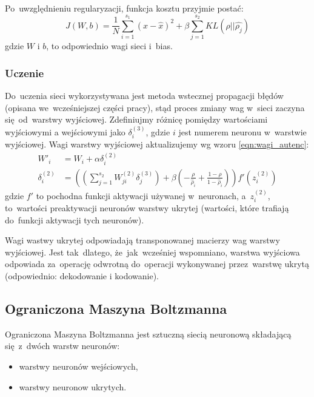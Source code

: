 Po~uwzględnieniu regularyzacji, funkcja kosztu przyjmie postać:
\begin{equation*}
J(W,b)=\frac{1}{N}\sum\limits_{i=1}^{s_1}(x-\hat{x})^2 + \beta\sum\limits_{j=1}^{s_2}KL(\rho||\hat{\rho_j})
\end{equation*}
gdzie $W$ i $b$, to odpowiednio wagi sieci i~bias.

\subsubsection{Uczenie}
Do~uczenia sieci wykorzystywana jest metoda wstecznej propagacji błędów (opisana we~wcześniejszej części pracy),
stąd proces zmiany wag w~sieci zaczyna się~od~warstwy wyjściowej. Zdefiniujmy różnicę pomiędzy wartościami wyjściowymi
a wejściowymi jako $\delta_i^{(3)}$, gdzie $i$ jest numerem neuronu w~warstwie wyjściowej.
Wagi warstwy wyjściowej aktualizujemy wg wzoru \ref{eqn:wagi_autenc}:
\begin{equation}
    \begin{split}
    W'_i &= W_i + \alpha\delta^{(2)}_i \\
    \delta_i^{(2)} &= \left( \left( \sum\limits_{j=1}^{s_{2}} W^{(2)}_{ji} \delta^{(3)}_j \right)
    + \beta \left( - \frac{\rho}{\hat\rho_i} + \frac{1-\rho}{1-\hat\rho_i} \right) \right) f'(z^{(2)}_i)
    \end{split}
    \label{eqn:wagi_autenc}
\end{equation}
gdzie $f'$ to pochodna funkcji aktywacji używanej w~neuronach, a~$z^{(2)}_i$, to~wartości preaktywacji neuronów warstwy
ukrytej (wartości, które trafiają do~funkcji aktywacji tych neuronów).

Wagi wastwy ukrytej odpowiadają transponowanej macierzy wag warstwy wyjściowej. Jest tak~dlatego, że~jak~wcześniej
wspomniano, warstwa wyjściowa odpowiada za~operację odwrotną do~operacji wykonywanej przez~warstwę ukrytą (odpowiednio:
dekodowanie i kodowanie).

\subsection{Ograniczona Maszyna Boltzmanna}
Ograniczona Maszyna Boltzmanna jest sztuczną siecią neuronową składającą się~z~dwóch warstw neuronów:
\begin{itemize}
  \item warstwy neuronów wejściowych,
  \item warstwy neuronow ukrytych.
\end{itemize}

